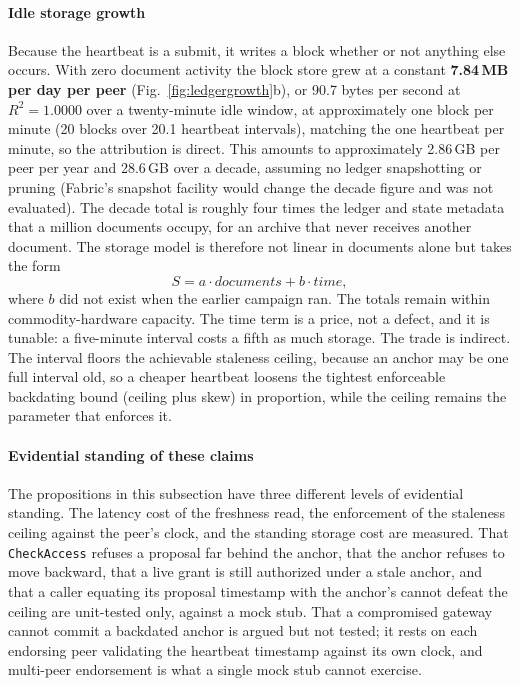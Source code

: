 \documentclass[preprint,12pt]{elsarticle}
\begin{document}
\paragraph{Idle storage growth}
Because the heartbeat is a submit, it writes a block whether or not anything
else occurs. With zero document activity the block store grew at a constant
\textbf{7.84\,MB per day per peer} (Fig.~\ref{fig:ledgergrowth}b), or 90.7 bytes per second at
$R^2 = 1.0000$ over a twenty-minute idle window, at approximately one block
per minute (20 blocks over 20.1 heartbeat intervals), matching the one heartbeat
per minute, so the attribution is direct. This amounts to approximately
2.86\,GB per peer per year and 28.6\,GB over a decade, assuming no ledger
snapshotting or pruning (Fabric's snapshot facility would change the decade
figure and was not evaluated). The decade total is roughly four times
the ledger and state metadata that a million documents occupy, for an archive
that never receives another document. The storage model is
therefore not linear in documents alone but takes the form
\begin{equation}
  S = a \cdot \mathit{documents} + b \cdot \mathit{time},
  \label{eq:storage_model}
\end{equation}
where $b$ did not exist when the earlier campaign ran. The totals remain
within commodity-hardware capacity. The time term is a price, not a defect, and it is
tunable: a five-minute interval costs a fifth as much storage. The trade is
indirect. The interval floors the achievable staleness ceiling, because an
anchor may be one full interval old, so a cheaper heartbeat loosens the
tightest enforceable backdating bound (ceiling plus skew) in proportion,
while the ceiling remains the parameter that enforces it.

\paragraph{Evidential standing of these claims}
The propositions in this subsection have three different levels of evidential standing.
The latency cost of the freshness read, the enforcement
of the staleness ceiling against the peer's clock, and the standing storage
cost are measured. That \texttt{CheckAccess} refuses a proposal far behind the
anchor, that the anchor refuses to move backward, that a live grant is still
authorized under a stale anchor, and that a caller equating its proposal
timestamp with the anchor's cannot defeat the ceiling are unit-tested only,
against a mock stub. That a compromised gateway cannot commit a backdated
anchor is argued but not tested; it rests on each endorsing peer validating
the heartbeat timestamp against its own clock, and multi-peer endorsement is
what a single mock stub cannot exercise.
\end{document}
